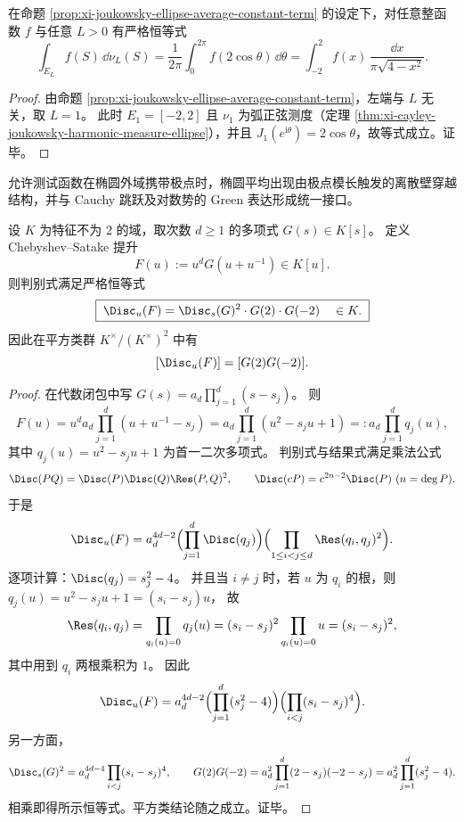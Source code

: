\begin{corollary}[椭圆--线段塌缩的母体恒等式]\label{cor:xi-joukowsky-ellipse-collapse-arcsine-master}
在命题 \ref{prop:xi-joukowsky-ellipse-average-constant-term} 的设定下，对任意整函数 \(f\) 与任意 \(L>0\) 有严格恒等式
\[
\int_{E_L} f(S)\,\dd\nu_L(S)
=\frac{1}{2\pi}\int_{0}^{2\pi} f(2\cos\theta)\,\dd\theta
=\int_{-2}^{2} f(x)\,\frac{\dd x}{\pi\sqrt{4-x^2}}.
\]
\end{corollary}
\begin{proof}
由命题 \ref{prop:xi-joukowsky-ellipse-average-constant-term}，左端与 \(L\) 无关，取 \(L=1\)。
此时 \(E_1=[-2,2]\) 且 \(\nu_1\) 为弧正弦测度（定理 \ref{thm:xi-cayley-joukowsky-harmonic-measure-ellipse}），并且 \(J_1(e^{\mathrm{i}\theta})=2\cos\theta\)，故等式成立。证毕。
\end{proof}



允许测试函数在椭圆外域携带极点时，椭圆平均出现由极点模长触发的离散壁穿越结构，并与 Cauchy 跳跃及对数势的 Green 表达形成统一接口。




\begin{proposition}\label{prop:xi-chebyshev-satake-discriminant-endpoint-localization}
设 \(K\) 为特征不为 \(2\) 的域，取次数 \(d\ge 1\) 的多项式 \(G(s)\in K[s]\)。
定义 Chebyshev--Satake 提升
\[
F(u):=u^{d}G(u+u^{-1})\in K[u].
\]
则判别式满足严格恒等式
\[
\boxed{\;
\Disc_u(F)=\Disc_s(G)^2\cdot G(2)\cdot G(-2)\quad\in K.\;}
\]
因此在平方类群 \(K^\times/(K^\times)^2\) 中有
\[
[\Disc_u(F)]=[G(2)G(-2)].
\]
\end{proposition}
\begin{proof}
在代数闭包中写 \(G(s)=a_d\prod_{j=1}^{d}(s-s_j)\)。
则
\[
F(u)=u^{d}a_d\prod_{j=1}^{d}(u+u^{-1}-s_j)
=a_d\prod_{j=1}^{d}(u^2-s_j u+1)
  =:a_d\prod_{j=1}^{d}q_j(u),
\]
其中 \(q_j(u)=u^2-s_j u+1\) 为首一二次多项式。
判别式与结果式满足乘法公式
\[
\Disc(PQ)=\Disc(P)\Disc(Q)\Res(P,Q)^2,
\qquad
\Disc(cP)=c^{2n-2}\Disc(P)\ (n=\deg P).
\]
于是
\[
\Disc_u(F)
=a_d^{4d-2}\Bigl(\prod_{j=1}^{d}\Disc(q_j)\Bigr)\Bigl(\prod_{1\le i<j\le d}\Res(q_i,q_j)^2\Bigr).
\]
逐项计算：\(\Disc(q_j)=s_j^2-4\)。
并且当 \(i\neq j\) 时，若 \(u\) 为 \(q_i\) 的根，则
\(
q_j(u)=u^2-s_j u+1=(s_i-s_j)u
\)，
故
\[
\Res(q_i,q_j)=\prod_{q_i(u)=0}q_j(u)=(s_i-s_j)^2\prod_{q_i(u)=0}u=(s_i-s_j)^2,
\]
其中用到 \(q_i\) 两根乘积为 \(1\)。
因此
\[
\Disc_u(F)=a_d^{4d-2}\Bigl(\prod_{j=1}^{d}(s_j^2-4)\Bigr)\Bigl(\prod_{i<j}(s_i-s_j)^4\Bigr).
\]
另一方面，
\[
\Disc_s(G)^2=a_d^{4d-4}\prod_{i<j}(s_i-s_j)^4,
\qquad
G(2)G(-2)=a_d^{2}\prod_{j=1}^{d}(2-s_j)(-2-s_j)=a_d^2\prod_{j=1}^{d}(s_j^2-4).
\]
相乘即得所示恒等式。平方类结论随之成立。证毕。
\end{proof}


